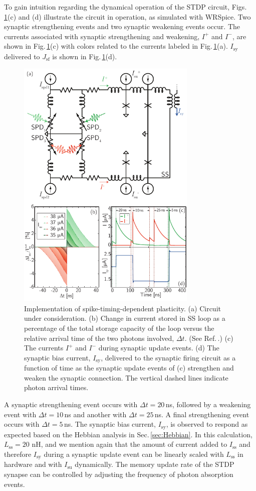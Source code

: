 \documentclass[twocolumn]{article}
\begin{document}
To gain intuition regarding the dynamical operation of the STDP circuit, Figs.\,\ref{fig:synapticPlasticity_stdp}(c) and (d) illustrate the circuit in operation, as simulated with WRSpice. Two synaptic strengthening events and two synaptic weakening events occur. The currents associated with synaptic strengthening and weakening, $I^+$ and $I^-$, are shown in Fig.\,\ref{fig:synapticPlasticity_stdp}(c) with colors related to the currents labeled in Fig.\,\ref{fig:synapticPlasticity_stdp}(a). $I_{\mathrm{sy}}$ delivered to $J_{\mathrm{sf}}$ is shown in Fig.\,\ref{fig:synapticPlasticity_stdp}(d). 
\begin{figure}[t!]
	\centerline{\includegraphics[width=8.6cm]{_synapticPlasticity_stdp_small.pdf}}
	\caption{\label{fig:synapticPlasticity_stdp}Implementation of spike-timing-dependent plasticity. (a) Circuit under consideration. (b) Change in current stored in SS loop as a percentage of the total storage capacity of the loop versus the relative arrival time of the two photons involved, $\Delta t$. (See Ref.\,\cite{somi2000}.)  (c) The currents $I^+$ and $I^-$ during synaptic update events. (d) The synaptic bias current, $I_{\mathrm{sy}}$, delivered to the synaptic firing circuit as a function of time as the synaptic update events of (c) strengthen and weaken the synaptic connection. The vertical dashed lines indicate photon arrival times.}
\end{figure}
A synaptic strengthening event occurs with $\Delta t = 20$\,ns, followed by a weakening event with $\Delta t = 10$\,ns and another with $\Delta t = 25$\,ns. A final strengthening event occurs with $\Delta t = 5$\,ns. The synaptic bias current, $I_{\mathrm{sy}}$, is observed to respond as expected based on the Hebbian analysis in Sec.\,\ref{sec:Hebbian}. In this calculation, $L_{\mathrm{ss}} = 20$ nH, and we mention again that the amount of current added to $I_{\mathrm{ss}}$ and therefore $I_{\mathrm{sy}}$ during a synaptic update event can be linearly scaled with $L_{\mathrm{ss}}$ in hardware and with $I_{\mathrm{su}}$ dynamically. The memory update rate of the STDP synapse can be controlled by adjusting the frequency of photon absorption events.
\end{document}
